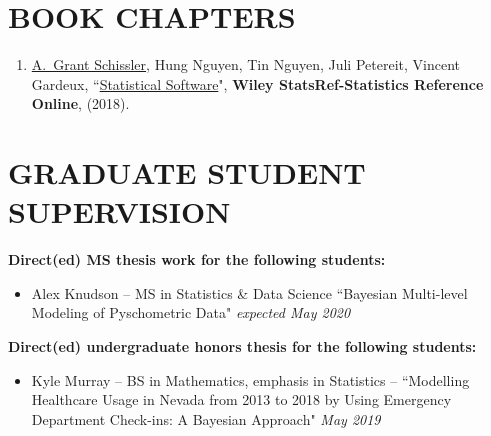 \documentclass[paper=a4,fontsize=11pt]{scrartcl} %
\newcommand{\NewPart}[2]{\section*{\uppercase{#1} #2 }}
\newcommand{\PaperEntry}[7]{
		\noindent #1, ``\href{#7}{#2}", \textit{#3} \textbf{#4}, #5 (#6).}
\newcommand{\ThesisEntry}[5]{
		\noindent #1 -- #2 #3 ``#4" \textit{#5}}
\begin{document}
\NewPart{Book chapters}{}
\vspace{-7pt}
\begin{enumerate}


 \item \PaperEntry{\underline{A.~Grant Schissler}, Hung Nguyen, Tin Nguyen, Juli Petereit, Vincent Gardeux}{Statistical Software}{}{Wiley StatsRef-Statistics Reference Online}{}{2018}{}
   
\end{enumerate}



\NewPart{Graduate student supervision}{}
\vspace{7pt}


\textbf{Direct(ed) MS thesis work for the following students:}

\begin{itemize}[noitemsep]

  \item \ThesisEntry{Alex Knudson}{MS in Statistics \& Data Science}{}{Bayesian Multi-level Modeling of Pyschometric Data}{expected May 2020}

  \end{itemize}

\textbf{Direct(ed) undergraduate honors thesis for the following students:}

\begin{itemize}[noitemsep]

  \item \ThesisEntry{Kyle Murray}{BS in Mathematics, emphasis in Statistics}{--}{Modelling Healthcare Usage in Nevada from 2013 to 2018 by Using Emergency Department Check-ins: A Bayesian Approach}{May 2019}

  \end{itemize}
\end{document}
